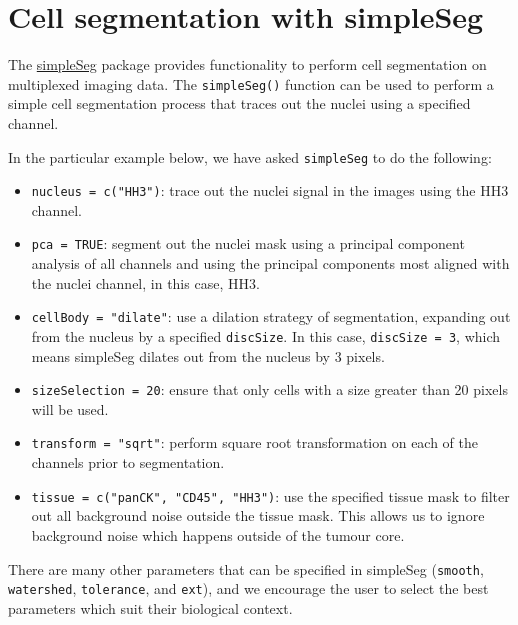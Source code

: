 \documentclass[
  letterpaper,
  DIV=11,
  numbers=noendperiod]{scrreprt}
\providecommand{\tightlist}{%
  \setlength{\itemsep}{0pt}\setlength{\parskip}{0pt}}\usepackage{longtable,booktabs,array}
\begin{document}
\section{Cell segmentation with
simpleSeg}\label{cell-segmentation-with-simpleseg}

The
\href{https://www.bioconductor.org/packages/release/bioc/html/simpleSeg.html}{simpleSeg}
package provides functionality to perform cell segmentation on
multiplexed imaging data. The \texttt{simpleSeg()} function can be used
to perform a simple cell segmentation process that traces out the nuclei
using a specified channel.

In the particular example below, we have asked \texttt{simpleSeg} to do
the following:

\begin{itemize}
\tightlist
\item
  \texttt{nucleus\ =\ c("HH3")}: trace out the nuclei signal in the
  images using the HH3 channel.
\item
  \texttt{pca\ =\ TRUE}: segment out the nuclei mask using a principal
  component analysis of all channels and using the principal components
  most aligned with the nuclei channel, in this case, HH3.
\item
  \texttt{cellBody\ =\ "dilate"}: use a dilation strategy of
  segmentation, expanding out from the nucleus by a specified
  \texttt{discSize}. In this case, \texttt{discSize\ =\ 3}, which means
  simpleSeg dilates out from the nucleus by 3 pixels.
\item
  \texttt{sizeSelection\ =\ 20}: ensure that only cells with a size
  greater than 20 pixels will be used.
\item
  \texttt{transform\ =\ "sqrt"}: perform square root transformation on
  each of the channels prior to segmentation.
\item
  \texttt{tissue\ =\ c("panCK",\ "CD45",\ "HH3")}: use the specified
  tissue mask to filter out all background noise outside the tissue
  mask. This allows us to ignore background noise which happens outside
  of the tumour core.
\end{itemize}

There are many other parameters that can be specified in simpleSeg
(\texttt{smooth}, \texttt{watershed}, \texttt{tolerance}, and
\texttt{ext}), and we encourage the user to select the best parameters
which suit their biological context.
\end{document}
